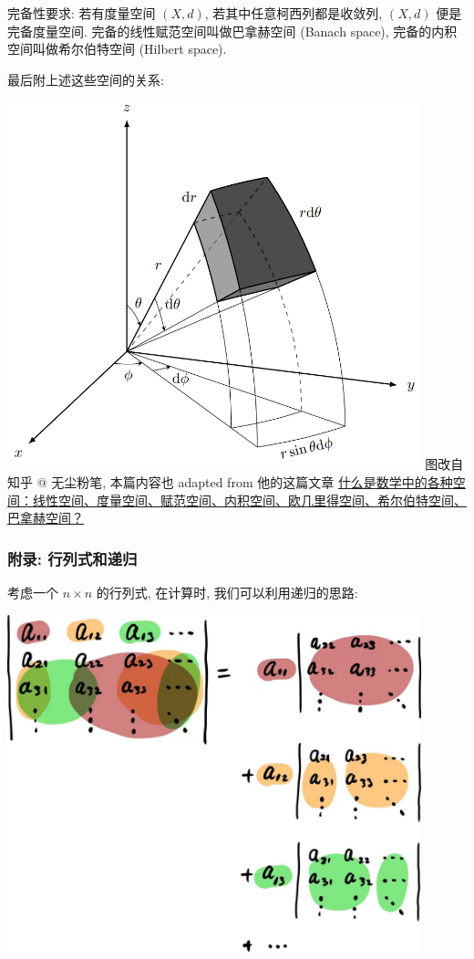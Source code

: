 完备性要求: 若有度量空间 \((X,d)\), 若其中任意柯西列都是收敛列,
\((X,d)\) 便是完备度量空间. 完备的线性赋范空间叫做巴拿赫空间 (Banach
space), 完备的内积空间叫做希尔伯特空间 (Hilbert space).

最后附上述这些空间的关系:

\begin{tcolorbox}[size=fbox, breakable, enhanced jigsaw]
  \includegraphics[width=0.9\textwidth]{img/image-20240117100344273.png}
图改自知乎 @ 无尘粉笔, 本篇内容也 adapted from 他的这篇文章
\href{https://zhuanlan.zhihu.com/p/541226732}{什么是数学中的各种空间：线性空间、度量空间、赋范空间、内积空间、欧几里得空间、希尔伯特空间、巴拿赫空间？}
\end{tcolorbox}

\subsubsection{附录: 行列式和递归}

考虑一个 \(n\times n\) 的行列式, 在计算时, 我们可以利用递归的思路:

\begin{tcolorbox}[size=fbox, breakable, enhanced jigsaw]
  \includegraphics[width=0.9\textwidth]{img/image-20240117150843442.png}
\end{tcolorbox}

